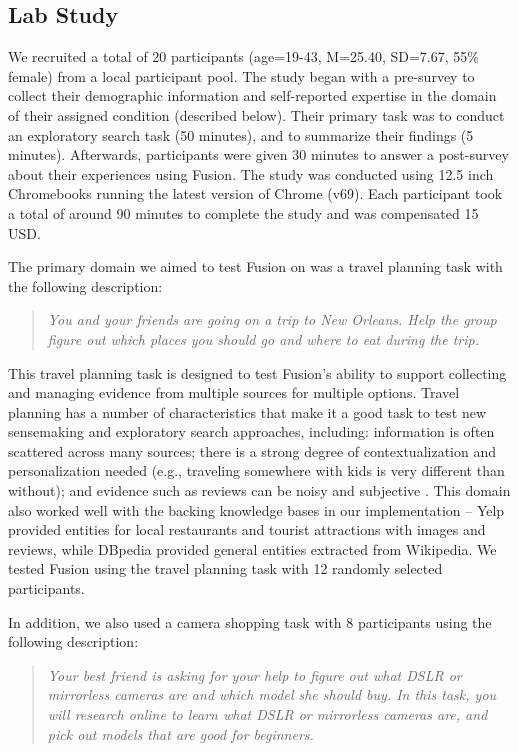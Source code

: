 \subsection{Lab Study}
We recruited a total of 20 participants (age=19-43, M=25.40, SD=7.67, 55\% female) from a local participant pool. The study began with a pre-survey to collect their demographic information and self-reported expertise in the domain of their assigned condition (described below). Their primary task was to conduct an exploratory search task (50 minutes), and to summarize their findings (5 minutes). Afterwards, participants were given 30 minutes to answer a post-survey about their experiences using Fusion. The study was conducted using 12.5 inch Chromebooks running the latest version of Chrome (v69). Each participant took a total of around 90 minutes to complete the study and was compensated 15 USD. 

The primary domain we aimed to test Fusion on was a travel planning task with the following description:

\begin{quote}
\emph{
You and your friends are going on a trip to New Orleans. Help the group figure out which places you should go and where to eat during the trip. 
}
\end{quote}

\noindent This travel planning task is designed to test Fusion's ability to support collecting and managing evidence from multiple sources for multiple options. Travel planning has a number of characteristics that make it a good task to test new sensemaking and exploratory search approaches, including: information is often scattered across many sources; there is a strong degree of contextualization and personalization needed (e.g., traveling somewhere with kids is very different than without); and evidence such as reviews can be noisy and subjective \cite{zhang2012human,chen2015tripplanner}.  This domain also worked well with the backing knowledge bases in our implementation -- Yelp provided entities for local restaurants and tourist attractions with images and reviews, while DBpedia provided general entities extracted from Wikipedia. We tested Fusion using the travel planning task with 12 randomly selected participants. 


In addition, we also used a camera shopping task with 8 participants using the following description:

\begin{quote}
    \emph{
Your best friend is asking for your help to figure out what DSLR or mirrorless cameras are and which model she should buy. In this task, you will research online to learn what DSLR or mirrorless cameras are, and pick out models that are good for beginners. 
    }
\end{quote}

